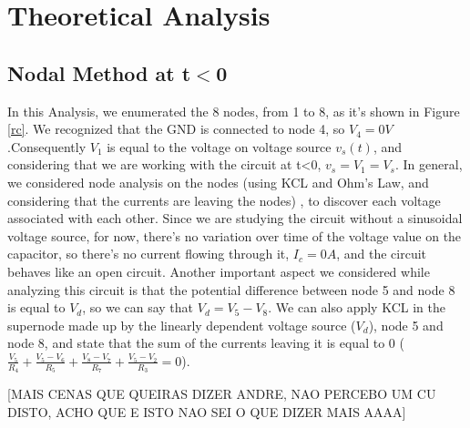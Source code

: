 \section{Theoretical Analysis} \label{sec:analysis}

\subsection{Nodal Method at t$<$0}


In this Analysis, we enumerated the 8 nodes, from 1 to 8, as it's shown in Figure \ref{rc}. We recognized that the GND is connected to node 4, so $V_{4}=0V$.Consequently $V_1$ is equal to the voltage on voltage source $v_s(t)$, and considering that we are working with the circuit at t<0, $v_s=V_1=V_s$.
In general, we considered node analysis on the nodes (using KCL and Ohm's Law, and considering that the currents are leaving the nodes) , to discover each voltage associated with each other. 
Since we are studying the circuit without a sinusoidal voltage source, for now, there's no variation over time of the voltage value on the capacitor, so there's no current flowing through it, $I_c=0A$, and the circuit behaves like an open circuit.
Another important aspect we considered while analyzing this circuit is that the potential difference between node 5 and node 8 is equal to $V_d$, so we can say that $V_d=V_5-V_8$. We can also apply KCL in the supernode made up by the linearly dependent voltage source ($V_d$), node 5 and node 8, and state that the sum of the currents leaving it is equal to 0 ($\frac{V_5}{R_4} + \frac{V_5-V_6}{R_5} + \frac{V_8-V_7}{R_7} + \frac{V_5-V_2}{R_3}=0$).

[MAIS CENAS QUE QUEIRAS DIZER ANDRE, NAO PERCEBO UM CU DISTO, ACHO QUE E ISTO NAO SEI O QUE DIZER MAIS AAAA]

